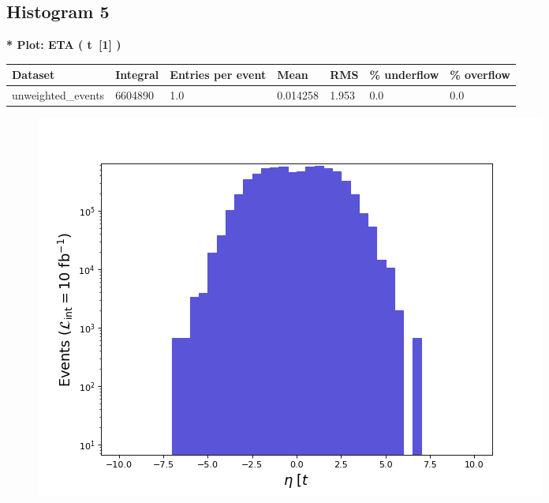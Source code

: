 \documentclass[a4paper, 10pt]{article}
\begin{document}
\subsection{ Histogram 5}

\textbf{* Plot: ETA ( t~[1] ) }\\
   \begin{table}[H]
  \begin{center}
    \begin{tabular}{|m{23.0mm}|m{23.0mm}|m{18.0mm}|m{19.0mm}|m{19.0mm}|m{19.0mm}|m{19.0mm}|}
      \hline
      {\cellcolor{yellow}         Dataset}& {\cellcolor{yellow}         Integral}& {\cellcolor{yellow}         Entries per event}& {\cellcolor{yellow}         Mean}& {\cellcolor{yellow}         RMS}& {\cellcolor{yellow}         \% underflow}& {\cellcolor{yellow}         \% overflow}\\
      \hline
      {\cellcolor{white}         unweighted\_events}& {\cellcolor{white}         6604890}& {\cellcolor{white}         1.0}& {\cellcolor{white}         0.014258}& {\cellcolor{white}         1.953}& {\cellcolor{green}         0.0}& {\cellcolor{green}         0.0}\\
\hline
    \end{tabular}
  \end{center}
\end{table}

\begin{figure}[H]
  \begin{center}
    \includegraphics[scale=0.45]{selection_4.png}\\
\caption{   }
  \end{center}
\end{figure}
      \newpage
\end{document}
